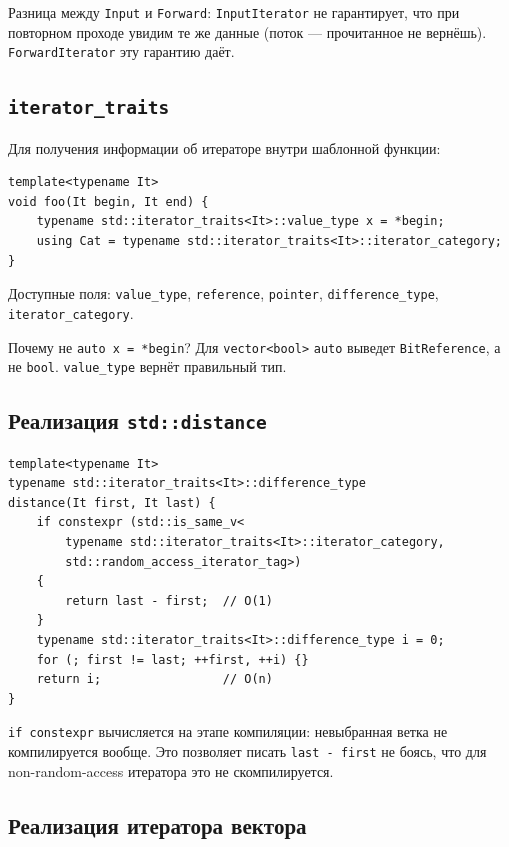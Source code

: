 \documentclass[a4paper,12pt]{article}
\begin{document}
\medskip
Разница между \texttt{Input} и \texttt{Forward}: \texttt{InputIterator}
не гарантирует, что при повторном проходе увидим те же данные (поток ---
прочитанное не вернёшь). \texttt{ForwardIterator} эту гарантию даёт.

\subsection{\texttt{iterator\_traits}}

Для получения информации об итераторе внутри шаблонной функции:

\begin{lstlisting}
template<typename It>
void foo(It begin, It end) {
    typename std::iterator_traits<It>::value_type x = *begin;
    using Cat = typename std::iterator_traits<It>::iterator_category;
}
\end{lstlisting}

Доступные поля: \texttt{value\_type}, \texttt{reference}, \texttt{pointer},
\texttt{difference\_type}, \texttt{iterator\_category}.

Почему не \texttt{auto x = *begin}? Для \texttt{vector<bool>} \texttt{auto}
выведет \texttt{BitReference}, а не \texttt{bool}. \texttt{value\_type}
вернёт правильный тип.

\subsection{Реализация \texttt{std::distance}}

\begin{lstlisting}
template<typename It>
typename std::iterator_traits<It>::difference_type
distance(It first, It last) {
    if constexpr (std::is_same_v<
        typename std::iterator_traits<It>::iterator_category,
        std::random_access_iterator_tag>)
    {
        return last - first;  // O(1)
    }
    typename std::iterator_traits<It>::difference_type i = 0;
    for (; first != last; ++first, ++i) {}
    return i;                 // O(n)
}
\end{lstlisting}

\texttt{if constexpr} вычисляется на этапе компиляции: невыбранная ветка
не компилируется вообще. Это позволяет писать \texttt{last - first} не
боясь, что для non-random-access итератора это не скомпилируется.

\subsection{Реализация итератора вектора}
\end{document}
